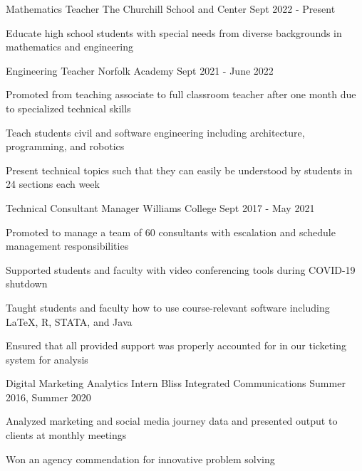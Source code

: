 \begin{cventries}
    \cventry
    {Mathematics Teacher}
    {The Churchill School and Center}
    {}
    {Sept 2022 - Present}
    {
      \begin{cvitems}
        \item {Educate high school students with special needs from diverse backgrounds in mathematics and engineering}
      \end{cvitems}
    }
    \cventry
    {Engineering Teacher}
    {Norfolk Academy}
    {}
    {Sept 2021 - June 2022}
    {
      \begin{cvitems}
        \item {Promoted from teaching associate to full classroom teacher after one month due to specialized technical skills}
        \item {Teach students civil and software engineering including architecture, programming, and robotics}
        \item {Present technical topics such that they can easily be understood by students in 24 sections each week}
      \end{cvitems}
    }
    \cventry
    {Technical Consultant Manager}
    {Williams College}
    {}
    {Sept 2017 - May 2021}
    {
      \begin{cvitems}
        \item {Promoted to manage a team of 60 consultants with escalation and schedule management responsibilities}
        \item{Supported students and faculty with video conferencing tools during COVID-19 shutdown}
        \item {Taught students and faculty how to use course-relevant software including LaTeX, R, STATA, and Java}
        \item {Ensured that all provided support was properly accounted for in our ticketing system for analysis}
      \end{cvitems}
    }
    \cventry
    {Digital Marketing Analytics Intern}
    {Bliss Integrated Communications}
    {}
    {Summer 2016, Summer 2020}
    {
      \begin{cvitems}
        \item {Analyzed marketing and social media journey data and presented output to clients at monthly meetings}
        \item {Won an agency commendation for innovative problem solving}

\end{cvitems}}
\end{cventries}
